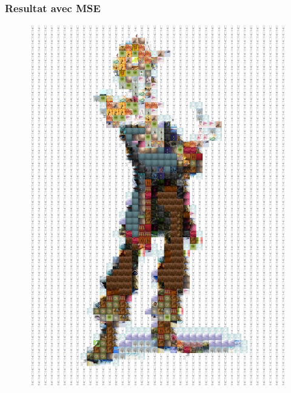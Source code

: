 \documentclass[handout]{beamer}
\begin{document}
\begin{frame}
\frametitle{\bf Resultat avec MSE }
\begin{figure}[H]
\includegraphics[scale=0.36]{guybrushmse.jpg}
\end{figure}
\end{frame}
\end{document}
